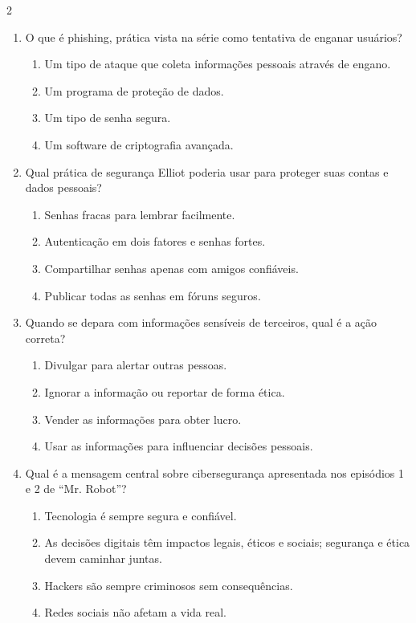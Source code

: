\documentclass[11pt]{article}
\begin{document}
\begin{multicols}{2}
\begin{enumerate}[leftmargin=*]
\item O que é phishing, prática vista na série como tentativa de enganar usuários?
\begin{enumerate}[label=\alph*)]
\item Um tipo de ataque que coleta informações pessoais através de engano.
\item Um programa de proteção de dados.
\item Um tipo de senha segura.
\item Um software de criptografia avançada.
\end{enumerate}

\item Qual prática de segurança Elliot poderia usar para proteger suas contas e dados pessoais?
\begin{enumerate}[label=\alph*)]
\item Senhas fracas para lembrar facilmente.
\item Autenticação em dois fatores e senhas fortes.
\item Compartilhar senhas apenas com amigos confiáveis.
\item Publicar todas as senhas em fóruns seguros.
\end{enumerate}

\item Quando se depara com informações sensíveis de terceiros, qual é a ação correta?
\begin{enumerate}[label=\alph*)]
\item Divulgar para alertar outras pessoas.
\item Ignorar a informação ou reportar de forma ética.
\item Vender as informações para obter lucro.
\item Usar as informações para influenciar decisões pessoais.
\end{enumerate}

\item Qual é a mensagem central sobre cibersegurança apresentada nos episódios 1 e 2 de ``Mr. Robot''?
\begin{enumerate}[label=\alph*)]
\item Tecnologia é sempre segura e confiável.
\item As decisões digitais têm impactos legais, éticos e sociais; segurança e ética devem caminhar juntas.
\item Hackers são sempre criminosos sem consequências.
\item Redes sociais não afetam a vida real.
\end{enumerate}


\end{enumerate}

\end{multicols}
\end{document}
